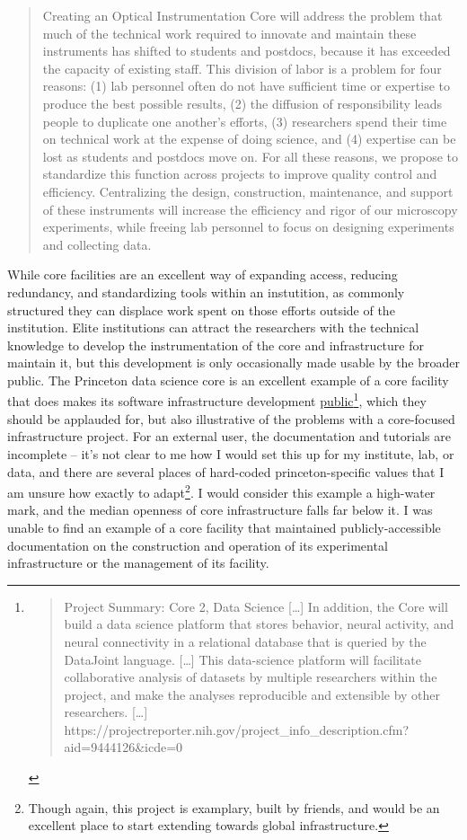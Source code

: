 \documentclass[notoc]{tufte-book}
\begin{document}
\begin{quote}
Creating an Optical Instrumentation Core will address the problem that
much of the technical work required to innovate and maintain these
instruments has shifted to students and postdocs, because it has
exceeded the capacity of existing staff. This division of labor is a
problem for four reasons: (1) lab personnel often do not have sufficient
time or expertise to produce the best possible results, (2) the
diffusion of responsibility leads people to duplicate one another's
efforts, (3) researchers spend their time on technical work at the
expense of doing science, and (4) expertise can be lost as students and
postdocs move on. For all these reasons, we propose to standardize this
function across projects to improve quality control and efficiency.
Centralizing the design, construction, maintenance, and support of these
instruments will increase the efficiency and rigor of our microscopy
experiments, while freeing lab personnel to focus on designing
experiments and collecting data.
\end{quote}

While core facilities are an excellent way of expanding access, reducing
redundancy, and standardizing tools within an instutition, as commonly
structured they can displace work spent on those efforts outside of the
institution. Elite institutions can attract the researchers with the
technical knowledge to develop the instrumentation of the core and
infrastructure for maintain it, but this development is only
occasionally made usable by the broader public. The Princeton data
science core is an excellent example of a core facility that does makes
its software infrastructure development
\href{https://github.com/BrainCOGS}{public}\footnote{\begin{quote}
  Project Summary: Core 2, Data Science {[}\ldots{]} In addition, the
  Core will build a data science platform that stores behavior, neural
  activity, and neural connectivity in a relational database that is
  queried by the DataJoint language. {[}\ldots{]} This data-science
  platform will facilitate collaborative analysis of datasets by
  multiple researchers within the project, and make the analyses
  reproducible and extensible by other researchers. {[}\ldots{]}
  https://projectreporter.nih.gov/project\_info\_description.cfm?aid=9444126\&icde=0
  \end{quote}}, which they should be applauded for, but also
illustrative of the problems with a core-focused infrastructure project.
For an external user, the documentation and tutorials are incomplete --
it's not clear to me how I would set this up for my institute, lab, or
data, and there are several places of hard-coded princeton-specific
values that I am unsure how exactly to adapt\footnote{Though again, this
  project is examplary, built by friends, and would be an excellent
  place to start extending towards global infrastructure.}. I would
consider this example a high-water mark, and the median openness of core
infrastructure falls far below it. I was unable to find an example of a
core facility that maintained publicly-accessible documentation on the
construction and operation of its experimental infrastructure or the
management of its facility.
\end{document}
